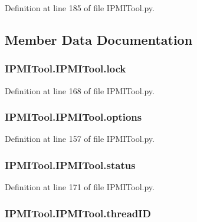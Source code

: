 Definition at line 185 of file I\-P\-M\-I\-Tool.\-py.



\subsection{Member Data Documentation}
\hypertarget{classIPMITool_1_1IPMITool_a36a9429fca7200e0a6d1d78002b95d11}{
\subsubsection[{lock}]{\setlength{\rightskip}{0pt plus 5cm}I\-P\-M\-I\-Tool.\-I\-P\-M\-I\-Tool.\-lock}}\label{classIPMITool_1_1IPMITool_a36a9429fca7200e0a6d1d78002b95d11}


Definition at line 168 of file I\-P\-M\-I\-Tool.\-py.

\hypertarget{classIPMITool_1_1IPMITool_a9f0f9484b1b8f6a0df8338f7894c8823}{
\subsubsection[{options}]{\setlength{\rightskip}{0pt plus 5cm}I\-P\-M\-I\-Tool.\-I\-P\-M\-I\-Tool.\-options}}\label{classIPMITool_1_1IPMITool_a9f0f9484b1b8f6a0df8338f7894c8823}


Definition at line 157 of file I\-P\-M\-I\-Tool.\-py.

\hypertarget{classIPMITool_1_1IPMITool_a4dba85133ceca9edff481c575cb468d9}{
\subsubsection[{status}]{\setlength{\rightskip}{0pt plus 5cm}I\-P\-M\-I\-Tool.\-I\-P\-M\-I\-Tool.\-status}}\label{classIPMITool_1_1IPMITool_a4dba85133ceca9edff481c575cb468d9}


Definition at line 171 of file I\-P\-M\-I\-Tool.\-py.

\hypertarget{classIPMITool_1_1IPMITool_aaa15d2dc90d9e3a45adc4519912c811d}{
\subsubsection[{thread\-I\-D}]{\setlength{\rightskip}{0pt plus 5cm}I\-P\-M\-I\-Tool.\-I\-P\-M\-I\-Tool.\-thread\-I\-D}}\label{classIPMITool_1_1IPMITool_aaa15d2dc90d9e3a45adc4519912c811d}


